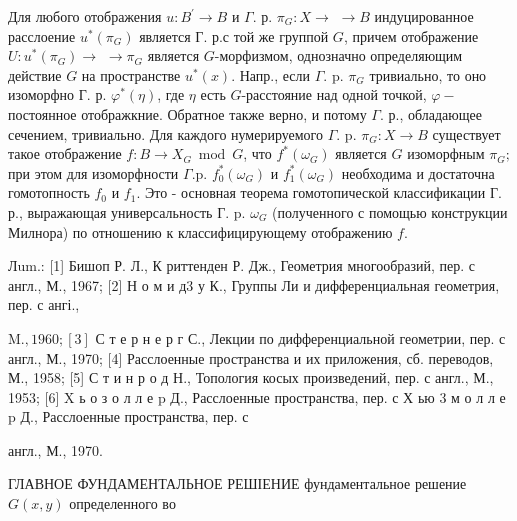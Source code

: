 \documentclass[10pt]{article}
\begin{document}
Для любого отображения $u: B^{\prime} \rightarrow B$ и $\Gamma$. р. $\pi_{G}: X \rightarrow$ $\rightarrow B$ индуцированное расслоение $u^{*}\left(\pi_{G}\right)$ является Г. р.с той же группой $G$, причем отображение $U: u^{*}\left(\pi_{G}\right) \rightarrow$ $\rightarrow \pi_{G}$ является $G$-морфизмом, однозначно определяющим действие $G$ на пространстве $u^{*}(x)$. Напр., если $\Gamma$. p. $\pi_{G}$ тривиально, то оно изоморфно Г. р. $\varphi^{*}(\eta)$, где $\eta$ есть $G$-расстояние над одной точкой, $\varphi-$ постоянное отображкние. Обратное также верно, и потому $\Gamma$. р., обладающее сечением, тривиально. Для каждого нумерируемого $\Gamma$. p. $\pi_{G}: X \rightarrow B$ существует такое отображение $f: B \rightarrow X_{G} \bmod G$, что $f^{*}\left(\omega_{G}\right)$ является $G$ изоморфным $\pi_{G} ;$ при этом для изоморфности $\Gamma . \mathrm{p}$. $f_{0}^{*}\left(\omega_{G}\right)$ и $f_{1}^{*}\left(\omega_{G}\right)$ необходима и достаточна гомотопность $f_{0}$ и $f_{1}$. Это - основная теорема гомотопической классификации Г. р., выражающая универсальность Г. p. $\omega_{G}$ (полученного с помощью конструкции Милнора) по отношению к классифицирующему отображению $f$.



Лum.: [1] Бишоп Р. Л., К риттенден Р. Дж., Геометрия многообразий, пер. с англ., М., 1967; [2] Н о м и д3 у К., Группы Ли и дифференциальная геометрия, пер. с ангі.,

$\mathrm{M} ., 1960 ;[3]$ С т е р н е р г С., Лекции по дифференциальной геометрии, пер. с англ., М., 1970; [4] Расслоенные пространства и их приложения, сб. переводов, М., 1958; [5] С т и н р о д Н., Топология косых произведений, пер. с англ., М., 1953; [6] $\mathrm{X}$ ь о з о л л е p Д., Расслоенные пространства, пер. с Х ью 3 м о л л е p Д., Расслоенные пространства, пер. с

англ., М., 1970.



ГЛАВНОЕ ФУНДАМЕНТАЛЬНОЕ РЕШІЕНИЕ фундаментальное решение $G(x, y)$ определенного во
\end{document}
